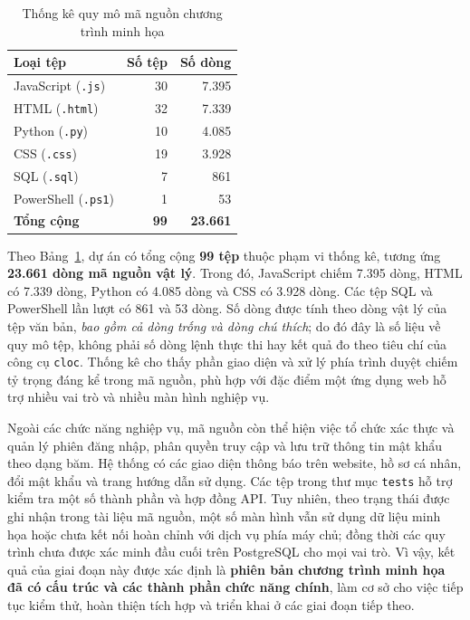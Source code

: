 \begin{table}[htbp]
    \centering
    \caption{Thống kê quy mô mã nguồn chương trình minh họa}
    \label{tab:c5-thong-ke-ma-nguon}
    \renewcommand{\arraystretch}{1.15}
    \begin{tabular}{|l|r|r|}
        \hline
        \textbf{Loại tệp} & \textbf{Số tệp} & \textbf{Số dòng} \\ \hline
        JavaScript (\texttt{.js}) & 30 & 7.395 \\ \hline
        HTML (\texttt{.html}) & 32 & 7.339 \\ \hline
        Python (\texttt{.py}) & 10 & 4.085 \\ \hline
        CSS (\texttt{.css}) & 19 & 3.928 \\ \hline
        SQL (\texttt{.sql}) & 7 & 861 \\ \hline
        PowerShell (\texttt{.ps1}) & 1 & 53 \\ \hline
        \textbf{Tổng cộng} & \textbf{99} & \textbf{23.661} \\ \hline
    \end{tabular}
\end{table}

Theo Bảng~\ref{tab:c5-thong-ke-ma-nguon}, dự án có tổng cộng \textbf{99 tệp} thuộc phạm vi thống kê, tương ứng \textbf{23.661 dòng mã nguồn vật lý}. Trong đó, JavaScript chiếm 7.395 dòng, HTML có 7.339 dòng, Python có 4.085 dòng và CSS có 3.928 dòng. Các tệp SQL và PowerShell lần lượt có 861 và 53 dòng. Số dòng được tính theo dòng vật lý của tệp văn bản, \textit{bao gồm cả dòng trống và dòng chú thích}; do đó đây là số liệu về quy mô tệp, không phải số dòng lệnh thực thi hay kết quả đo theo tiêu chí của công cụ \texttt{cloc}. Thống kê cho thấy phần giao diện và xử lý phía trình duyệt chiếm tỷ trọng đáng kể trong mã nguồn, phù hợp với đặc điểm một ứng dụng web hỗ trợ nhiều vai trò và nhiều màn hình nghiệp vụ.

Ngoài các chức năng nghiệp vụ, mã nguồn còn thể hiện việc tổ chức xác thực và quản lý phiên đăng nhập, phân quyền truy cập và lưu trữ thông tin mật khẩu theo dạng băm. Hệ thống có các giao diện thông báo trên website, hồ sơ cá nhân, đổi mật khẩu và trang hướng dẫn sử dụng. Các tệp trong thư mục \texttt{tests} hỗ trợ kiểm tra một số thành phần và hợp đồng API. Tuy nhiên, theo trạng thái được ghi nhận trong tài liệu mã nguồn, một số màn hình vẫn sử dụng dữ liệu minh họa hoặc chưa kết nối hoàn chỉnh với dịch vụ phía máy chủ; đồng thời các quy trình chưa được xác minh đầu cuối trên PostgreSQL cho mọi vai trò. Vì vậy, kết quả của giai đoạn này được xác định là \textbf{phiên bản chương trình minh họa đã có cấu trúc và các thành phần chức năng chính}, làm cơ sở cho việc tiếp tục kiểm thử, hoàn thiện tích hợp và triển khai ở các giai đoạn tiếp theo.

